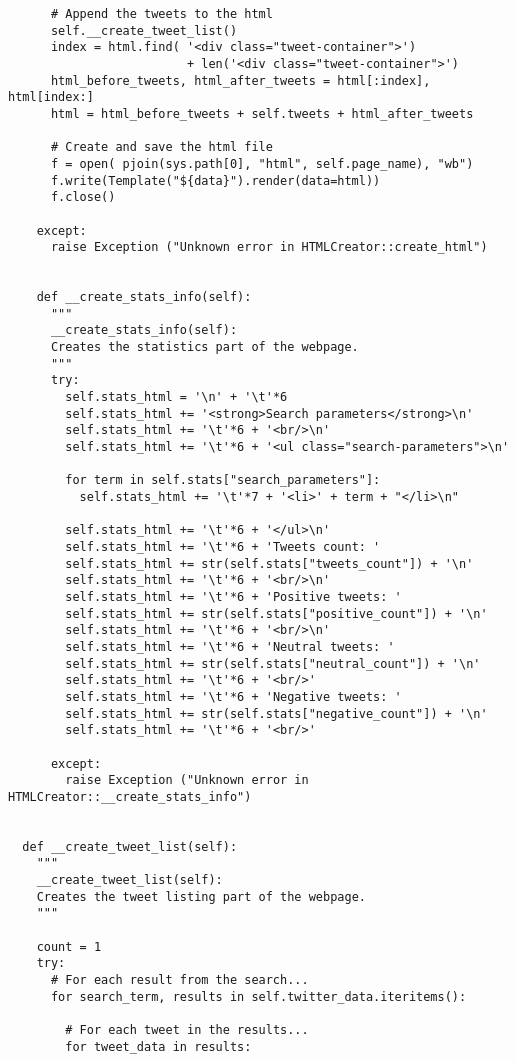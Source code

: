 \begin{verbatim}
      # Append the tweets to the html
      self.__create_tweet_list()
      index = html.find( '<div class="tweet-container">')
                         + len('<div class="tweet-container">')
      html_before_tweets, html_after_tweets = html[:index], html[index:]
      html = html_before_tweets + self.tweets + html_after_tweets

      # Create and save the html file
      f = open( pjoin(sys.path[0], "html", self.page_name), "wb")
      f.write(Template("${data}").render(data=html))
      f.close()

    except:
      raise Exception ("Unknown error in HTMLCreator::create_html")


    def __create_stats_info(self):
      """
      __create_stats_info(self):
      Creates the statistics part of the webpage.
      """
      try:
        self.stats_html = '\n' + '\t'*6
        self.stats_html += '<strong>Search parameters</strong>\n'
        self.stats_html += '\t'*6 + '<br/>\n'
        self.stats_html += '\t'*6 + '<ul class="search-parameters">\n'

        for term in self.stats["search_parameters"]:
          self.stats_html += '\t'*7 + '<li>' + term + "</li>\n"

        self.stats_html += '\t'*6 + '</ul>\n'
        self.stats_html += '\t'*6 + 'Tweets count: '
        self.stats_html += str(self.stats["tweets_count"]) + '\n'
        self.stats_html += '\t'*6 + '<br/>\n'
        self.stats_html += '\t'*6 + 'Positive tweets: '
        self.stats_html += str(self.stats["positive_count"]) + '\n'
        self.stats_html += '\t'*6 + '<br/>\n'
        self.stats_html += '\t'*6 + 'Neutral tweets: '
        self.stats_html += str(self.stats["neutral_count"]) + '\n'
        self.stats_html += '\t'*6 + '<br/>'
        self.stats_html += '\t'*6 + 'Negative tweets: '
        self.stats_html += str(self.stats["negative_count"]) + '\n'
        self.stats_html += '\t'*6 + '<br/>'

      except:
        raise Exception ("Unknown error in HTMLCreator::__create_stats_info")


  def __create_tweet_list(self):
    """
    __create_tweet_list(self):
    Creates the tweet listing part of the webpage.
    """

    count = 1
    try:
      # For each result from the search...
      for search_term, results in self.twitter_data.iteritems():
        
        # For each tweet in the results...
        for tweet_data in results:
          

\end{verbatim}
